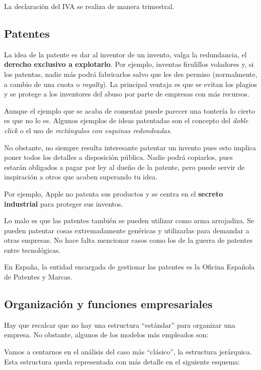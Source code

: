\documentclass[nochap,palatino,shortheader]{apuntes}
\begin{document}
\obs La declaración del IVA se realiza de manera trimestral.

\subsection{Patentes}

La idea de la patente es dar al inventor de un invento, valga la redundancia, el \textbf{derecho exclusivo a explotarlo}. Por ejemplo, inventas firulillos voladores y, si los patentas, nadie más podrá fabricarlos salvo que les des permiso (normalmente, a cambio de una cuota o \textit{royalty}). La principal ventaja es que se evitan los plagios y se protege a los inventores del abuso por parte de empresas con más recursos.

Aunque el ejemplo que se acaba de comentar puede parecer una tontería lo cierto es que no lo es. Algunos ejemplos de ideas patentadas son el concepto del \textit{doble click} o el uso de \textit{rectángulos con esquinas redondeadas}.

No obstante, no siempre resulta interesante patentar un invento pues esto implica poner todos los detalles a disposición pública. Nadie podrá copiarlos, pues estarán obligados a pagar por ley al dueño de la patente, pero puede servir de inspiración a otros que acaben superando tu idea.

Por ejemplo, Apple no patenta sus productos y se centra en el \textbf{secreto industrial} para proteger sus inventos.

Lo malo es que las patentes también se pueden utilizar como arma arrojadiza. Se pueden patentar cosas extremadamente genéricas y utilizarlas para demandar a otras empresas. No hace falta mencionar casos como los de la guerra de patentes entre tecnológicas.

En España, la entidad encargada de gestionar las patentes es la Oficina Española de Patentes y Marcas.

\subsection{Organización y funciones empresariales}

Hay que recalcar que no hay una estructura ``estándar'' para organizar una empresa. No obstante, algunos de los modelos más empleados son:

Vamos a centarnos en el análisis del caso más ``clásico'', la estructura jerárquica. Esta estructura queda representada con más detalle en el siguiente esquema:
\end{document}
